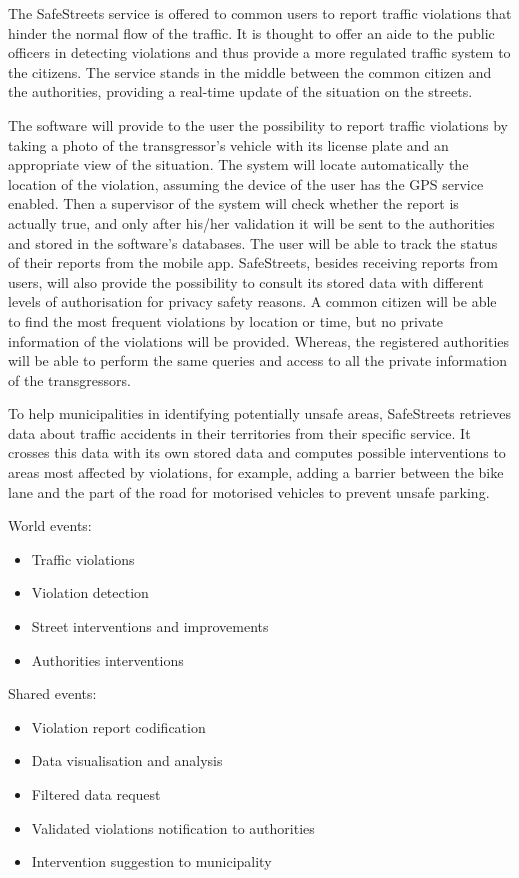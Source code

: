 The SafeStreets service is offered to common users to report traffic violations that hinder the normal flow of the traffic. It is thought to offer an aide to the public officers in detecting violations and thus provide a more regulated traffic system to the citizens. The service stands in the middle between the common citizen and the authorities, providing a real-time update of the situation on the streets.

The software will provide to the user the possibility to report traffic violations by taking a photo of the transgressor's vehicle with its license plate and an appropriate view of the situation. The system will locate automatically the location of the violation, assuming the device of the user has the GPS service enabled. Then a supervisor of the system will check whether the report is actually true, and only after his/her validation it will be sent to the authorities and stored in the software's databases. The user will be able to track the status of their reports from the mobile app. SafeStreets, besides receiving reports from users, will also provide the possibility to consult its stored data with different levels of authorisation for privacy safety reasons. A common citizen will be able to find the most frequent violations by location or time, but no private information of the violations will be provided. Whereas, the registered authorities will be able to perform the same queries and access to all the private information of the transgressors.

To help municipalities in identifying potentially unsafe areas, SafeStreets retrieves data about traffic accidents in their territories from their specific service. It crosses this data with its own stored data and computes possible interventions to areas most affected by violations, for example, adding a barrier between the bike lane and the part of the road for motorised vehicles to prevent unsafe parking.


World events:
\begin{itemize}
    \item Traffic violations
    \item Violation detection
    \item Street interventions and improvements
    \item Authorities interventions
\end{itemize}

Shared events:
\begin{itemize}
    \item Violation report codification
    \item Data visualisation and analysis
    \item Filtered data request
    \item Validated violations notification to authorities
    \item Intervention suggestion to municipality
\end{itemize}

